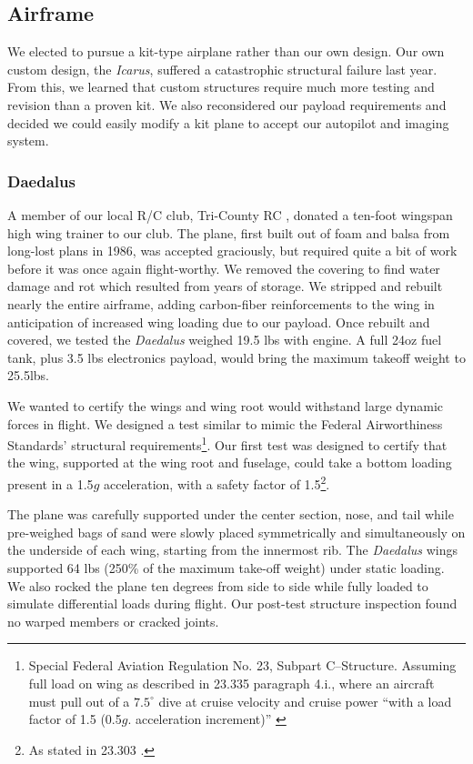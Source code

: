 \documentclass[10pt]{report}
\newcommand{\degrees}[1]
{
\begin{math}
#1^{\circ} 
\end{math}
}
\begin{document}
\subsection{Airframe}

We elected to pursue a kit-type airplane rather than our own design. 
Our own custom design, the \emph{Icarus}, suffered a catastrophic structural failure last year. From this, we learned that custom structures require much more testing and revision than a proven kit. We also reconsidered our payload requirements and decided we could easily modify a kit plane to accept our autopilot and imaging system.

\subsubsection{Daedalus}

A member of our local R/C club, Tri-County RC \cite{tricountyRC}, donated a ten-foot wingspan high wing trainer to our club. The plane, first built out of foam and balsa from long-lost plans in 1986, was accepted graciously, but required quite a bit of work before it was once again flight-worthy. We removed the covering to find water damage and rot which resulted from years of storage. We stripped and rebuilt nearly the entire airframe, adding carbon-fiber reinforcements to the wing in anticipation of increased wing loading due to our payload. Once rebuilt and covered, we tested the \emph{Daedalus} weighed 19.5 lbs with engine. A full 24oz fuel tank, plus 3.5 lbs electronics payload, would bring the maximum takeoff weight to 25.5lbs.

We wanted to certify the wings and wing root would withstand large dynamic forces in flight. 
We designed a test similar to mimic the 
Federal Airworthiness Standards' structural requirements\footnote{Special Federal Aviation Regulation No. 23, Subpart C--Structure. Assuming full load on wing as described in 23.335 paragraph 4.i., where an aircraft must pull out of a \degrees{7.5} dive at cruise velocity and cruise power ``with a load factor of 1.5 (0.5$g$. acceleration increment)'' \cite{far23}}. Our first test was designed to certify that the wing, supported at the wing root and fuselage, could take a bottom loading present in a 1.5$g$ acceleration, with a safety factor of 1.5\footnote{As stated in 23.303 \cite{far23}.}.
 
The plane was carefully supported under the center section, nose, and tail while pre-weighed bags of sand were slowly placed symmetrically and simultaneously on the underside of each wing, starting from the innermost rib.  The \emph{Daedalus} wings supported 64 lbs (250\% of the maximum take-off weight) under static loading.  We also rocked the plane ten degrees from side to side while fully loaded to simulate differential loads during flight. Our post-test structure inspection found no warped members or cracked joints.
\end{document}

